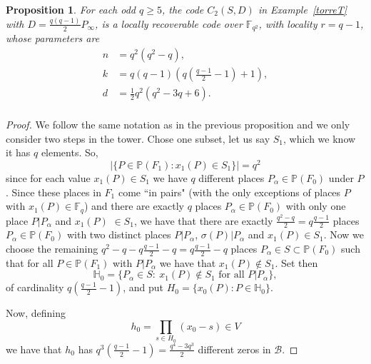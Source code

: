 \documentclass{amsart}
\newcommand{\m}{\mathcal}
\newcommand{\F}{\mathbb{F}}
\renewcommand{\P}{\mathbb{P}}
\newtheorem{pro}[thm]{Proposition}
\theoremstyle{definition}
\begin{document}
\begin{pro}\label{prop42}
	For each odd $q\geq 5$, the code $C_2(S,D)$ in Example~\ref{torreT} with $D = \frac{q(q-1)}{2}P_{\infty}$,
 is a locally recoverable code over $\F_{q^2}$, with locality $r=q-1$, whose parameters are %
  \begin{align*}
	n&=q^2(q^2-q), \\
	k&=q(q-1) \left(q \left(\frac{q-1}{2}-1 \right) +1\right), \\
	d&=\frac{1}{2}q^2\left(q^2 -3q +6 \right).\\
	\end{align*}

\end{pro}

\begin{proof}
	We follow the same notation as in the previous proposition and we only consider two steps in the tower. %
	Chose one subset, let us say $S_1$, which we know it has $q$ elements.  So, $$|\{P \in \P(F_1):x_1(P)\in S_1\}|=q^2$$ since for each value $x_1(P) \in S_1$ we have $q$ different places $P_\alpha \in \P(F_0)$ under $P$. Since  these places in $F_1$ %
	come ``in pairs" (with the only exceptions of places $P$ with $x_1(P) \in \F_q$) and there are exactly $q$ places $P_{\alpha} \in \P(F_0)$ with only one place $P|P_{\alpha}$ and $x_1(P)$ $ \in S_1$, %
	we have that there are exactly  $ \frac{q^2-q}{2} = q \frac{q-1}{2}$ places $P_{\alpha} \in \P(F_0)$ with two distinct places $P|P_{\alpha}$, $\sigma(P)|P_{\alpha}$ and $x_1(P) \in S_1$. Now we choose the remaining $q^2-q-q\frac{q-1}{2}-q = q\frac{q-1}{2}-q$ places $P_{\alpha} \in S\subset \P(F_0)$ such that for all $P\in \P(F_1)$ with $P| P_{\alpha}$ we have that $x_1(P) \not\in S_1$. Set then%
	$$\mathbb{H}_0 = \{P_\alpha \in S: \: x_1(P) \not\in S_1  \text{ for all }P | P_{\alpha}\},$$ of cardinality $q \left(\frac{q-1}{2}-1\right)$, and put $H_0=\{x_0(P): P \in \mathbb{H}_0\}$.
	
	Now, defining $$h_0 = \prod_{s \in H_0} (x_0 -s) \in V$$ we have that $h_0$ has $q^3 \left(\frac{q-1}{2}-1\right) = \frac{q^4-3q^3}{2}$ different zeros in $\m{B}$. %
	

\end{proof}
\end{document}
